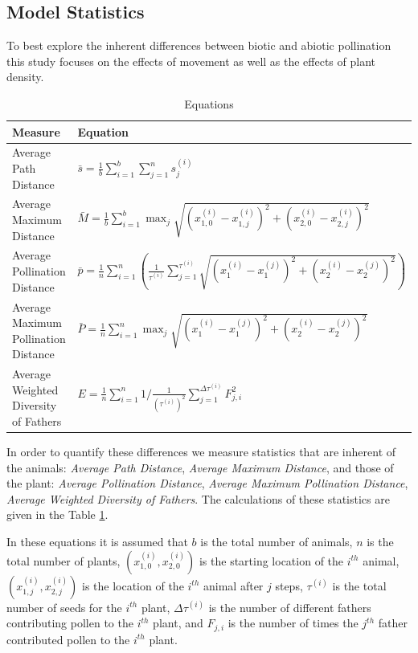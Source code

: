 \documentclass{tran-l}
\theoremstyle{definition}
\theoremstyle{remark}
\numberwithin{equation}{subsection}
\begin{document}
\subsection{Model Statistics}
To best explore the inherent differences between biotic and abiotic pollination this study focuses on the effects of movement as well as the effects of plant density.  
\begin{table}[h]\label{eqn}
\begin{tabular}{|l|l|}
  \hline
  Measure & Equation \\ \hline   \hline
  Average Path Distance & $\displaystyle\bar{s} = \frac{1}{b} \sum_{i=1}^b \sum_{j=1}^n s^{\left(i\right)}_j$ \\ \hline
  Average Maximum Distance & $\displaystyle \bar{M} = \frac{1}{b} \sum_{i=1}^b \max_j \sqrt{\left(x^{\left(i\right)}_{1,0}
- x^{\left(i\right)}_{1,j}\right)^2 +
			\left(x^{\left(i\right)}_{2,0} -
x^{\left(i\right)}_{2,j}\right)^2}  $ \\  \hline
  Average Pollination Distance & $\displaystyle \bar{p} = \frac{1}{n} \sum_{i=1}^{n} \left(
\frac{1}{\tau^{\left(i\right)}} \sum_{j=1}^{\tau^{\left(i\right)}}
\sqrt{\left(x^{\left(i\right)}_1 -
x^{\left(j\right)}_1\right)^2 + \left(x^{\left(i\right)}_2 -
		x^{\left(j\right)}_2\right)^2}
		\right)  $ \\  \hline
  Average Maximum Pollination Distance & $\displaystyle \bar{P} = \frac{1}{n} \sum_{i=1}^{n} \max_j \sqrt{\left(x^{\left(i\right)}_1 -
x^{\left(j\right)}_1\right)^2 + \left(x^{\left(i\right)}_2 -
		x^{\left(j\right)}_2\right)^2}$ \\  \hline
  Average Weighted Diversity of Fathers & $\displaystyle E = \frac{1}{n} \sum_{i=1}^n 1/\frac{1}{\left(\tau^{\left(i\right)}\right)^2}
\sum_{j=1}^{\Delta\tau^{\left(i\right)}} F^2_{j,i} $ \\
  \hline
\end{tabular}
\caption{Equations}
\end{table}
In order to quantify these differences we measure statistics that are inherent of the animals: \emph{Average Path Distance}, \emph{Average Maximum Distance}, and those of the plant: \emph{Average Pollination Distance},
\emph{Average Maximum Pollination Distance}, \emph{Average Weighted Diversity of Fathers}.  The calculations of these statistics are given in the Table \ref{eqn}.

In these equations it is assumed that $b$ is the total number of animals, $n$ is the total number of plants, $(x_{1,0}^{(i)},x_{2,0}^{(i)})$ is the starting location of the $i^{th}$ animal, $(x_{1,j}^{(i)},x_{2,j}^{(i)})$ is the location of the $i^{th}$ animal after $j$ steps, $\tau^{(i)}$ is the total number of seeds for the $i^{th}$ plant, $\Delta\tau^{(i)}$ is the number of different fathers contributing pollen to the $i^{th}$ plant, and $F_{j,i}$ is the number of times the $j^{th}$ father contributed pollen to the $i^{th}$ plant.
\end{document}

